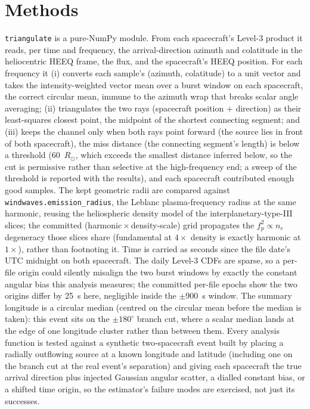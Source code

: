 \documentclass[twocolumn]{aastex631}
\newcommand{\code}[1]{\texttt{#1}}
\begin{document}
\section{Methods}
\code{triangulate} is a pure-NumPy module. From each spacecraft's Level-3 product it reads, per time
and frequency, the arrival-direction azimuth and colatitude in the heliocentric HEEQ frame, the flux,
and the spacecraft's HEEQ position. For each frequency it (i) converts each sample's
(azimuth, colatitude) to a unit vector and takes the intensity-weighted vector mean over a
burst window on each spacecraft, the correct circular mean, immune to the azimuth wrap that breaks
scalar angle averaging; (ii) triangulates the two rays (spacecraft position $+$ direction) as their
least-squares closest point, the midpoint of the shortest connecting segment; and (iii) keeps the
channel only when both rays point forward (the source lies in front of both spacecraft), the
miss distance (the connecting segment's length) is below a threshold (60~$R_\odot$, which
exceeds the smallest distance inferred below, so the cut is permissive rather than selective
at the high-frequency end; a sweep of the threshold is reported with the results), and each spacecraft
contributed enough good samples. The kept geometric radii are compared against
\code{windwaves.emission\_radius}, the Leblanc plasma-frequency radius at the same harmonic, reusing
the heliospheric density model of the interplanetary-type-III slices; the committed
(harmonic\,$\times$\,density-scale) grid propagates the $f_p^2\propto n_e$ degeneracy those
slices share (fundamental at $4\times$ density is exactly harmonic at $1\times$), rather than
footnoting it. Time is carried as seconds since the file date's UTC midnight on both spacecraft.
The daily Level-3 CDFs are sparse, so a per-file origin could silently misalign the two
burst windows by exactly the constant angular bias this analysis measures; the committed
per-file epochs show the two origins differ by 25~s here, negligible inside the $\pm$900~s
window. The summary longitude is a circular median (centred on the circular mean before the
median is taken): this event sits on the $\pm180^\circ$ branch cut, where a scalar median
lands at the edge of one longitude cluster rather than between them. Every analysis function is
tested against a synthetic two-spacecraft event built by placing a radially outflowing source at
a known longitude and latitude (including one on the branch cut at the real event's
separation) and giving each spacecraft the true arrival direction plus injected Gaussian
angular scatter, a dialled constant bias, or a shifted time origin, so the estimator's failure
modes are exercised, not just its successes.
\end{document}
